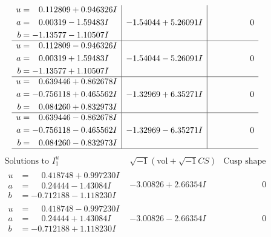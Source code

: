 \documentclass[1p]{elsarticle_modified}
\theoremstyle{definition}
\newcommand{\I}{\sqrt{-1}}
\begin{document}
$$\begin{array}{c|c|c}
\begin{aligned}
u &= \phantom{-}0.112809 + 0.946326 I \\
a &= \phantom{-}0.00319 - 1.59483 I \\
b &= -1.13577 - 1.10507 I\end{aligned}
 & -1.54044 + 5.26091 I & \phantom{-0.000000 } 0 \\ \hline\begin{aligned}
u &= \phantom{-}0.112809 - 0.946326 I \\
a &= \phantom{-}0.00319 + 1.59483 I \\
b &= -1.13577 + 1.10507 I\end{aligned}
 & -1.54044 - 5.26091 I & \phantom{-0.000000 } 0 \\ \hline\begin{aligned}
u &= \phantom{-}0.639446 + 0.862678 I \\
a &= -0.756118 + 0.465562 I \\
b &= \phantom{-}0.084260 + 0.832973 I\end{aligned}
 & -1.32969 + 6.35271 I & \phantom{-0.000000 } 0 \\ \hline\begin{aligned}
u &= \phantom{-}0.639446 - 0.862678 I \\
a &= -0.756118 - 0.465562 I \\
b &= \phantom{-}0.084260 - 0.832973 I\end{aligned}
 & -1.32969 - 6.35271 I & \phantom{-0.000000 } 0\\
 \hline 
 \end{array}$$\newpage$$\begin{array}{c|c|c}  
\text{Solutions to }I^u_{1}& \I (\text{vol} + \sqrt{-1}CS) & \text{Cusp shape}\\
 \hline 
\begin{aligned}
u &= \phantom{-}0.418748 + 0.997230 I \\
a &= \phantom{-}0.24444 - 1.43084 I \\
b &= -0.712188 - 1.118230 I\end{aligned}
 & -3.00826 + 2.66354 I & \phantom{-0.000000 } 0 \\ \hline\begin{aligned}
u &= \phantom{-}0.418748 - 0.997230 I \\
a &= \phantom{-}0.24444 + 1.43084 I \\
b &= -0.712188 + 1.118230 I\end{aligned}
 & -3.00826 - 2.66354 I & \phantom{-0.000000 } 0 \\ \hline\begin{aligned}

\end{aligned}
\end{array}$$
\end{document}
